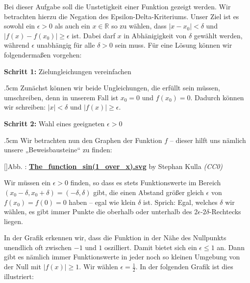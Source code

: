 \documentclass[fontsize=9pt,
               parskip=half-,
               DIV=14,
               listof=chapterentry,
               tocflat]{scrbook}
\newcounter{imagelabel}
\newenvironment{indentblock}{\begin{adjustwidth}{.5cm}{}}{\end{adjustwidth}}
\newcommand{\proofstep}[1]{\textbf{\textcolor{sblau}{#1}}}
\begin{document}
\begin{solutionprocess*}
Bei dieser Aufgabe soll die Unstetigkeit einer Funktion gezeigt werden. Wir betrachten hierzu die Negation des Epsilon-Delta-Kriteriums. Unser Ziel ist es sowohl ein $\epsilon >0$ als auch ein $x\in \mathbb {R} $ so zu wählen, dass $|x-x_{0}|<\delta $ und $|f(x)-f(x_{0})|\geq \epsilon $ ist. Dabei darf $x$ in Abhänigigkeit von $\delta $ gewählt werden, während $\epsilon $ unabhängig für alle $\delta >0$ sein muss. Für eine Lösung können wir folgendermaßen vorgehen:

\proofstep{Schritt 1:}
 Zielungleichungen vereinfachen\begin{indentblock}
Zunächst können wir beide Ungleichungen, die erfüllt sein müssen, umschreiben, denn in unserem Fall ist $x_{0}=0$ und $f(x_{0})=0$. Dadurch können wir schreiben: $|x|<\delta $ und $|f(x)|\geq \epsilon $.

\end{indentblock}

\proofstep{Schritt 2:}
 Wahl eines geeigneten $\epsilon >0$\begin{indentblock}
Wir betrachten nun den Graphen der Funktion $f$ – dieser hilft uns nämlich unsere „Beweisbausteine“ zu finden:

[]{Abb. : \protect\href{https://commons.wikimedia.org/wiki/File:The_function_sin(1_over_x).svg}{\textbf{The\allowbreak\_function\allowbreak\_sin(1\allowbreak\_over\allowbreak\_x).svg}} by Stephan Kulla \textit{(CC0)}}\begin{center}
\end{center}

Wir müssen ein $\epsilon >0$ finden, so dass es stets Funktionswerte im Bereich $(x_{0}-\delta ,x_{0}+\delta )=(-\delta ,\delta )$ gibt, die einen Abstand größer gleich $\epsilon $ von $f(x_{0})=f(0)=0$ haben – egal wie klein $\delta $ ist. Sprich: Egal, welches $\delta $ wir wählen, es gibt immer Punkte die oberhalb oder unterhalb des $2\epsilon $-$2\delta $-Rechtecks liegen.

In der Grafik erkennen wir, dass die Funktion in der Nähe des Nullpunkts unendlich oft zwischen $-1$ und $1$ oszilliert. Damit bietet sich ein $\epsilon \leq 1$ an. Dann gibt es nämlich immer Funktionswerte in jeder noch so kleinen Umgebung von der Null mit $|f(x)|\geq 1$. Wir wählen $\epsilon ={\tfrac {1}{2}}$. In der folgenden Grafik ist dies illustriert:


\end{indentblock}
\end{solutionprocess*}
\end{document}

